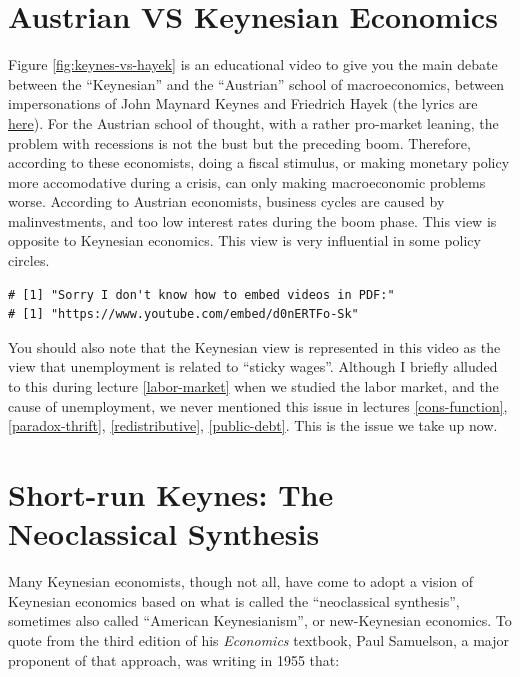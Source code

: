 \documentclass[]{book}
\begin{document}
\section{Austrian VS Keynesian
Economics}\label{austrian-vs-keynesian-economics}

Figure \ref{fig:keynes-vs-hayek} is an educational video to give you the
main debate between the ``Keynesian'' and the ``Austrian'' school of
macroeconomics, between impersonations of John Maynard Keynes and
Friedrich Hayek (the lyrics are
\href{http://hayekcenter.org/?p=1954}{here}). For the Austrian school of
thought, with a rather pro-market leaning, the problem with recessions
is not the bust but the preceding boom. Therefore, according to these
economists, doing a fiscal stimulus, or making monetary policy more
accomodative during a crisis, can only making macroeconomic problems
worse. According to Austrian economists, business cycles are caused by
malinvestments, and too low interest rates during the boom phase. This
view is opposite to Keynesian economics. This view is very influential
in some policy circles.



\begin{verbatim}
# [1] "Sorry I don't know how to embed videos in PDF:"
# [1] "https://www.youtube.com/embed/d0nERTFo-Sk"
\end{verbatim}

You should also note that the Keynesian view is represented in this
video as the view that unemployment is related to ``sticky wages''.
Although I briefly alluded to this during lecture \ref{labor-market}
when we studied the labor market, and the cause of unemployment, we
never mentioned this issue in lectures \ref{cons-function},
\ref{paradox-thrift}, \ref{redistributive}, \ref{public-debt}. This is
the issue we take up now.

\section{Short-run Keynes: The Neoclassical
Synthesis}\label{short-run-keynes-the-neoclassical-synthesis}

Many Keynesian economists, though not all, have come to adopt a vision
of Keynesian economics based on what is called the ``neoclassical
synthesis'', sometimes also called ``American Keynesianism'', or
new-Keynesian economics. To quote from the third edition of his
\emph{Economics} textbook, Paul Samuelson, a major proponent of that
approach, was writing in 1955 that:
\end{document}
